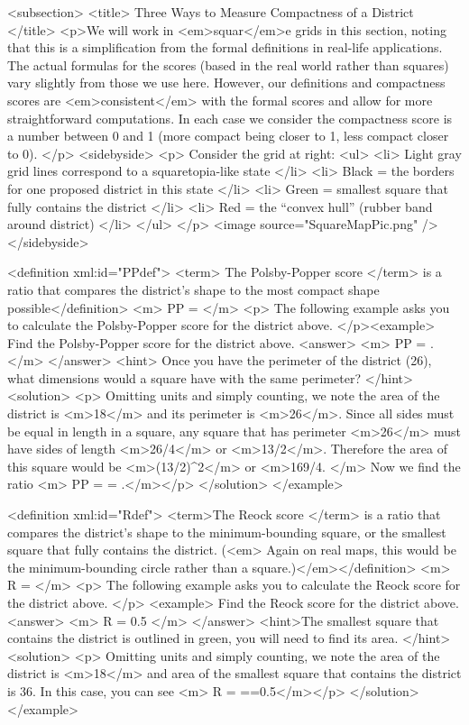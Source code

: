 			<subsection>
			<title> Three Ways to Measure Compactness of a District </title>
			<p>We will work in <em>squar</em>e grids in this section, noting that this is a simplification from the formal definitions in real-life applications.  The actual formulas for the scores (based in the real world rather than squares)  vary slightly from those we use here. However, our definitions and compactness scores are <em>consistent</em> with the formal scores and allow for more straightforward computations. In each case we consider the compactness score is a number between 0 and 1 (more compact being closer to 1, less compact closer to 0). </p>
			<sidebyside>
			<p> Consider the grid at right:
			<ul>
			<li> Light gray grid lines correspond to a squaretopia-like state </li>
 <li> Black = the borders for one proposed district in this state </li>
 <li> Green = smallest square that fully contains the district  </li>
  <li> Red = the “convex hull” (rubber band around district)  </li>
  </ul>
  </p>
  			<image source="SquareMapPic.png" />
</sidebyside>


			<definition xml:id="PPdef"> <term> The Polsby-Popper score </term>  is a ratio that compares the district's shape to the most compact shape possible</definition>
			<m> PP =\displaystyle{}  </m>
<p> The following example asks you to calculate the Polsby-Popper score for the district above. </p><example> Find the Polsby-Popper score for the district above.
<answer> <m> PP =  .</m> </answer>
<hint> Once you have the perimeter of the district (26), what dimensions would a square have with the same perimeter? </hint>
<solution> <p> Omitting units and simply counting, we note the area of the district is <m>18</m> and its perimeter is <m>26</m>.  Since all sides must be equal in length in a square, any square that has perimeter <m>26</m> must have sides of length <m>26/4</m> or <m>13/2</m>. Therefore the area of this square would be <m>(13/2)^2</m> or <m>169/4. </m>  Now we find the ratio <m> PP = = .</m></p>  </solution>
 </example>

<definition xml:id="Rdef"> <term>The Reock score </term> is a ratio that compares the district's shape to the minimum-bounding square, or the smallest square that fully contains the district. (<em> Again on real maps, this would be the minimum-bounding circle rather than a square.)</em></definition>
<m> R =\displaystyle{} </m>
<p> The following example asks you to calculate the Reock score for the district above. </p> <example> Find the Reock score for the district above.
<answer> <m> R = 0.5 </m> </answer>
<hint>The smallest square that contains the district is outlined in green, you will need to find its area. </hint>
<solution>
<p> Omitting units and simply counting, we note the area of the district is <m>18</m> and area of the smallest square that contains the district is 36.  In this case, you can see <m> R = ==0.5</m></p>
</solution>
</example>




